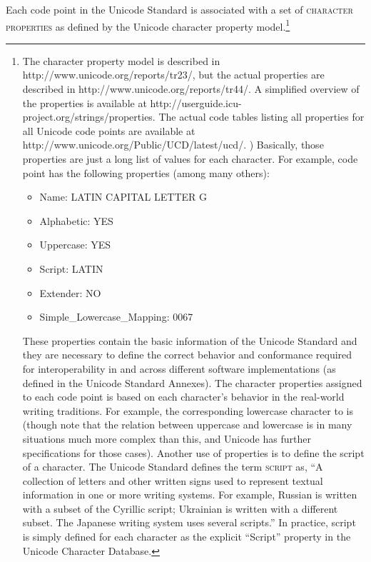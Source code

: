 {{{{{{{{{{{{{Each code point in the Unicode Standard is associated with a set of \textsc{character properties} as defined by the Unicode character property model.\footnote{The character property model is described in http://www.unicode.org/reports/tr23/, but the actual properties are described in http://www.unicode.org/reports/tr44/. A simplified overview of the properties is available at http://userguide.icu-project.org/strings/properties. The actual code tables listing all properties for all Unicode code points are available at http://www.unicode.org/Public/UCD/latest/ucd/. ) Basically, those properties are just a long list of values for each character. For example, code point  has the following properties (among many others):
\begin{itemize}
	\item Name: LATIN CAPITAL LETTER G 
	\item Alphabetic: YES 
	\item Uppercase: YES 
	\item Script: LATIN 
	\item Extender: NO 
	\item Simple\_Lowercase\_Mapping: 0067 
\end{itemize}

These properties contain the basic information of the Unicode Standard and they are necessary to define the correct behavior and conformance required for interoperability in and across different software implementations (as defined in the Unicode Standard Annexes). The character properties assigned to each code point is based on each character's behavior in the real-world writing traditions. For example, the corresponding lowercase character to  is  (though note that the relation between uppercase and lowercase is in many situations much more complex than this, and Unicode has further specifications for those cases). Another use of properties is to define the script of a character. The Unicode Standard defines the term \textsc{script} as, ``A collection of letters and other written signs used to represent textual information in one or more writing systems. For example, Russian is written with a subset of the Cyrillic script; Ukrainian is written with a different subset. The Japanese writing system uses several scripts.'' In practice, script is simply defined for each character as the explicit ``Script'' property in the Unicode Character Database.

}}}}}}}}}}}}}}
